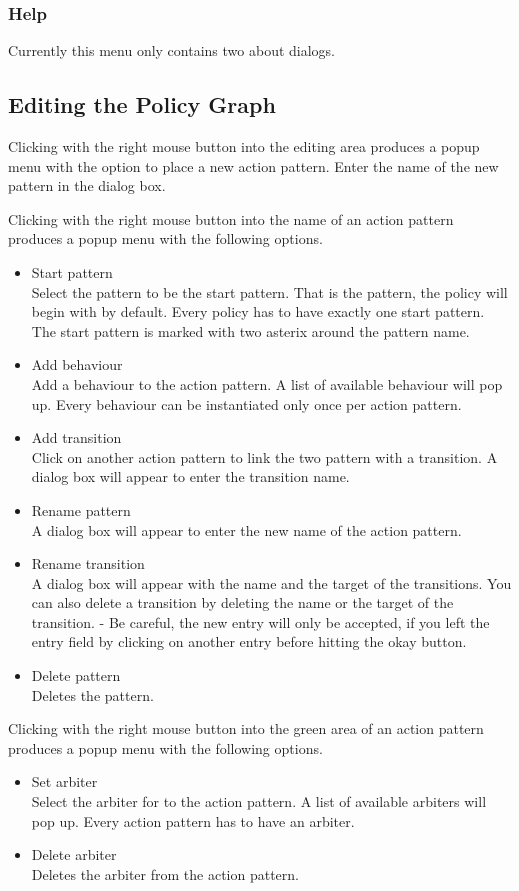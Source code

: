 \subsubsection{Help}
Currently this menu only contains two about dialogs.

\subsection{Editing the Policy Graph}

Clicking with the right mouse button into the editing area produces
a popup menu with the option to place a new action pattern. Enter the
name of the new pattern in the dialog box.

Clicking with the right mouse button into the name of an action
pattern produces a popup menu with the following options.
\begin{itemize}
\item Start pattern \\
  Select the pattern to be the start pattern. That is the pattern, the
  policy will begin with by default. Every policy has to have exactly
  one start pattern. The start pattern is marked with two asterix
  around the pattern name.
\item Add behaviour \\
  Add a behaviour to the action pattern. A list of available behaviour
  will pop up. Every behaviour can be instantiated only once per
  action pattern.
\item Add transition \\
  Click on another action pattern to link the two pattern with a
  transition. A dialog box will appear to enter the transition name.
\item Rename pattern \\
  A dialog box will appear to enter the new name of the action
  pattern.
\item Rename transition \\
  A dialog box will appear with the name and the target of the
  transitions. You can also delete a transition by deleting the name
  or the target of the transition. - Be careful, the new entry
  will only be accepted, if you left the entry field by clicking on
  another entry before hitting the okay button.
\item Delete pattern \\
  Deletes the pattern.
\end{itemize}

Clicking with the right mouse button into the green area of an action
pattern produces a popup menu with the following options.
\begin{itemize}
\item Set arbiter \\
  Select the arbiter for to the action pattern. A list of available arbiters
  will pop up. Every action pattern has to have an arbiter.
\item Delete arbiter \\
  Deletes the arbiter from the action pattern.
\end{itemize}

